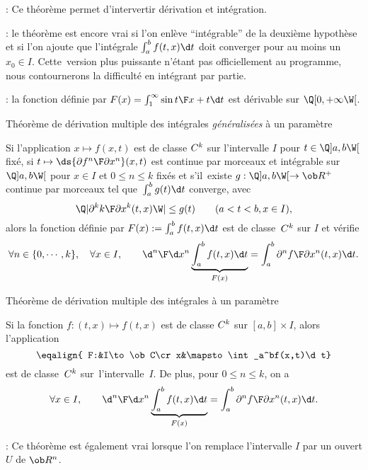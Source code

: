 \Remarque : Ce théorème permet d'intervertir dérivation et intégration. 
\bigskip

\Remarque : le théorème est encore vrai si l'on enlève ``intégrable'' de la deuxième hypothèse et si l'on ajoute que l'intégrale $\int_a^bf(t,x)\d t$ doit converger pour au moins un $x_0\in I$. 
Cette~version plus puissante n'étant pas officiellement au programme, nous contournerons la difficulté en intégrant par partie. 
\bigskip

\Application : la fonction définie par $F(x)=\int_1^\infty{\sin t\F x+t}\d t$ est dérivable sur $\Q[0, +\infty\W[$. 

\Concept [Index=Theoreme@Théorème!de derivation des integrales a un parametre@de dérivation des intégrales à un paramètre] Théorème de dérivation multiple des intégrales {\it généralisées} à un paramètre

Si l'application $x\mapsto f(x,t)$ est de classe $\sc C^k$ sur l'intervalle $I$ pour $t\in\Q]a,b\W[$ fixé, \pn
si $t\mapsto\ds{\partial f^n\F\partial x^n}(x,t)$ est continue par morceaux et intégrable sur $\Q]a,b\W[$ pour $x\in I$ et $0\le n\le k$ fixés et 
s'il~existe $g:\Q]a,b\W[\to\ob R^+$continue par morceaux tel que~$\int_a^bg(t)\d t$ converge, avec 
$$
\Q|{\partial^kk\F\partial x^k}(t,x)\W|\le g(t)\qquad(a<t<b, x\in I),
$$
alors la fonction définie par $F(x):=\int_a^bf(t,x)\d t$ est de classe~$\sc C^k$ sur $I$ et vérifie
$$
\forall n\in\{0, \cdots, k\}, \quad \forall x\in I, \qquad {\d^n\F\d x^n}\underbrace{\int_a^bf(t,x)\d t}_{F(x)}=\int_a^b{\partial^n f\F\partial x^n}(t,x)\d t. 
$$


\Concept [Index=Theoreme@Théorème!de derivation des integrales a un parametre@de dérivation des intégrales à un paramètre] Théorème de dérivation multiple des intégrales à un paramètre

Si la fonction $f:(t,x)\mapsto f(t,x)$ est de classe $\sc C^k$ sur $[a,b]\times I$, alors l'application 
$$
\eqalign{
F:&I\to\ob C\cr
x&\mapsto\int_a^bf(x,t)\d t}
$$
est de classe~$\sc C^k$ sur~l'intervalle~$I$. De plus, pour $0\le n\le k$, on a 
$$
\forall x\in I, \qquad {\d^n\F\d x^n}\underbrace{\int_a^bf(t,x)\d t}_{F(x)}=\int_a^b{\partial^n f\F\partial x^n}(t,x)\d t. 
$$

\Remarque : Ce théorème est également vrai lorsque l'on remplace l'intervalle $I$ par un ouvert $U$ de $\ob R^n$. 
\bigskip

